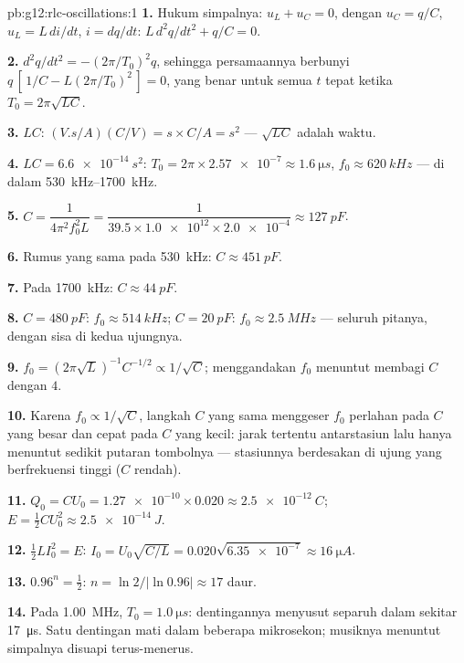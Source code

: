 \begin{solution}{pb:g12:rlc-oscillations:1}
\textbf{1.} Hukum simpalnya: $u_L + u_C = 0$, dengan $u_C = q/C$,
$u_L = L\,di/dt$, $i = dq/dt$: $L\,d^2q/dt^2 + q/C = 0$.

\textbf{2.} $d^2q/dt^2 = -(2\pi/T_0)^2 q$, sehingga persamaannya berbunyi
$q\,[\,1/C - L(2\pi/T_0)^2\,] = 0$, yang benar untuk semua $t$ tepat ketika
$T_0 = 2\pi\sqrt{LC}$.

\textbf{3.} $LC$: $(\unit{V.s/A})(\unit{C/V}) = \unit{s} \times
\unit{C/A} = \unit{s^2}$ --- $\sqrt{LC}$ adalah waktu.

\textbf{4.} $LC = \qty{6.6e-14}{s^2}$: $T_0 = 2\pi \times \num{2.57e-7}
\approx \qty{1.6}{\micro s}$, $f_0 \approx \qty{620}{kHz}$ --- di dalam
\qtyrange{530}{1700}{kHz}.

\textbf{5.} $C = \dfrac{1}{4\pi^2 f_0^2 L} = \dfrac{1}{39.5 \times
\num{1.0e12} \times \num{2.0e-4}} \approx \qty{127}{pF}$.

\textbf{6.} Rumus yang sama pada \qty{530}{kHz}: $C \approx \qty{451}{pF}$.

\textbf{7.} Pada \qty{1700}{kHz}: $C \approx \qty{44}{pF}$.

\textbf{8.} $C = \qty{480}{pF}$: $f_0 \approx \qty{514}{kHz}$;
$C = \qty{20}{pF}$: $f_0 \approx \qty{2.5}{MHz}$ --- seluruh pitanya,
dengan sisa di kedua ujungnya.

\textbf{9.} $f_0 = (2\pi\sqrt{L})^{-1}C^{-1/2} \propto 1/\sqrt{C}$;
menggandakan $f_0$ menuntut membagi $C$ dengan $4$.

\textbf{10.} Karena $f_0 \propto 1/\sqrt{C}$, langkah $C$ yang sama menggeser
$f_0$ perlahan pada $C$ yang besar dan cepat pada $C$ yang kecil: jarak tertentu
antarstasiun lalu hanya menuntut sedikit putaran tombolnya --- stasiunnya berdesakan di
ujung yang berfrekuensi tinggi ($C$ rendah).

\textbf{11.} $Q_0 = CU_0 = \num{1.27e-10} \times 0.020 \approx
\qty{2.5e-12}{C}$; $E = \tfrac12 CU_0^2 \approx \qty{2.5e-14}{J}$.

\textbf{12.} $\tfrac12 LI_0^2 = E$: $I_0 = U_0\sqrt{C/L} =
0.020\sqrt{\num{6.35e-7}} \approx \qty{16}{\micro A}$.

\textbf{13.} $0.96^n = \tfrac12$: $n = \ln 2/\lvert\ln 0.96\rvert
\approx 17$ daur.

\textbf{14.} Pada \qty{1.00}{MHz}, $T_0 = \qty{1.0}{\micro s}$: dentingannya
menyusut separuh dalam sekitar \qty{17}{\micro s}. Satu dentingan mati dalam beberapa mikrosekon;
musiknya menuntut simpalnya disuapi terus-menerus.


\end{solution}
